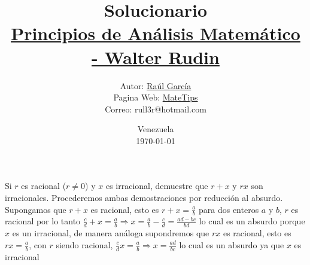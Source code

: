 \documentclass[10pt,a4paper]{jhwhw}
\author{Autor: \href{https://www.facebook.com/ruller}{Raúl García}\\Pagina Web: \href{https://rull3r.github.io/}{MateTips}\\Correo: rull3r@hotmail.com}
\date{Venezuela\\ \today \\}
\title{Solucionario \\\href{https://books.google.co.ve/books?id=i4aToAEACAAJ}{Principios de Análisis Matemático - Walter Rudin}\\}
\begin{document}
	
	\problema{ }\label{pro:1}
	Si $r$ es racional ($r\neq0$) y $x$ es irracional, demuestre que $r + x$ y $rx$ son irracionales.
	\solution 
	Procederemos ambas demostraciones por reducción al absurdo. Supongamos que $r+x$ es racional, esto es $r+x=\frac{a}{b}$ para dos enteros $a$ y $b$, $r$ es racional por lo tanto $\frac{c}{d}+x=\frac{a}{b}\Rightarrow x=\frac{a}{b}-\frac{c}{d}=\frac{ad-bc}{bd}$ lo cual es un absurdo porque $x$ es un irracional, de manera análoga supondremos que $rx$ es racional, esto es $rx=\frac{a}{b}$, con $r$ siendo racional, $\frac{c}{d}x=\frac{a}{b}\Rightarrow x=\frac{ad}{bc}$ lo cual es un absurdo ya que $x$ es irracional \QEPD
	
\end{document}

